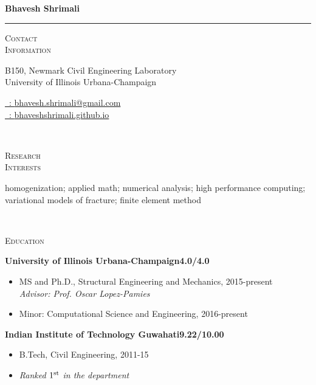 \documentclass[10pt]{article}
\begin{document}
{}

{\Large \bf %
	Bhavesh Shrimali}\\[-2mm] \rule{1.02\textwidth}{.5pt}\vspace{3mm}
\begin{minipage}[t]{0.15\linewidth}
	{\textsc{Contact}} \\ \textsc{Information}
\end{minipage}\hfill
\begin{minipage}[t]{0.50\linewidth}
	B150, Newmark Civil Engineering Laboratory\\
	University of Illinois Urbana-Champaign
\end{minipage}\hfill
\begin{minipage}[t]{0.3\linewidth}
\begin{flushright}
	\href{mailto:bhavesh.shrimali@gmail.com}{\faEnvelope\ : \textsf{bhavesh.shrimali@gmail.com}}\\
	\href{https://bhaveshshrimali.github.io}{\faGlobe\ : \textsf{bhaveshshrimali.github.io}}
\end{flushright}
\end{minipage}\\[3mm]
\begin{minipage}{0.15\linewidth}
	\textsc{Research}\\ \textsc{Interests}
\end{minipage}\hfill 
\begin{minipage}{0.825\linewidth}
homogenization; applied math; numerical analysis; high performance computing;\\ variational models of fracture; finite element method
\end{minipage}\hfill\\[3mm]
\begin{minipage}{0.15\linewidth}
	\textsc{Education}
\end{minipage}\hfill 
\begin{minipage}[t]{0.825\linewidth}
	{\bf {University of Illinois Urbana-Champaign}}\hfill {\bf 4.0/4.0}
	\begin{itemize}[label={},topsep=0.5mm,itemsep=-2pt,itemindent=-1.2em]
	\item MS and Ph.D., Structural Engineering and Mechanics, 2015-present\\ \textsl{Advisor: Prof. Oscar Lopez-Pamies}
	\item Minor: Computational Science and Engineering, 2016-present
	\end{itemize}\vspace{1ex}
	{\bf Indian Institute of Technology Guwahati}\hfill {\bf 9.22/10.00}
	\begin{itemize}[label={},topsep=0.5mm,itemsep=-2pt,itemindent=-1.2em]
		\item 	B.Tech, Civil Engineering, 2011-15
		\item \textsl{Ranked $1^{\rm st}$ in the department}
	\end{itemize}
\end{minipage}\\[4mm] 
\end{document}
